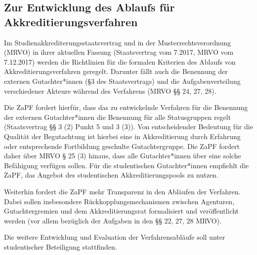 
\subsection{Zur Entwicklung des Ablaufs für Akkreditierungsverfahren}
Im Studienakkrediterungsstaatsvertrag und in der Musterrechtsverordnung (MRVO) in ihrer aktuellen Fassung (Staatsvertrag vom 7.2017, MRVO vom 7.12.2017) werden die Richtlinien für die formalen Kriterien des Ablaufs von Akkreditierungsverfahren geregelt. Darunter fällt auch die Benennung der externen Gutachter*innen (§3 des Staatsvertrags) und die Aufgabenverteilung verschiedener Akteure während des Verfahrens (MRVO §§ 24, 27, 28).

Die ZaPF fordert hierfür, dass das zu entwickelnde Verfahren für die Benennung der externen Gutachter*innen die Benennung für alle Statusgruppen regelt (Staatsvertrag §§ 3 (2) Punkt 5 und 3 (3)). Von entscheidender Bedeutung für die Qualität der Begutachtung ist hierbei eine in Akkreditierung durch Erfahrung oder entsprechende Fortbildung geschulte Gutachtergruppe. Die ZaPF fordert daher über MRVO § 25 (3) hinaus, dass alle Gutachter*innen über eine solche Befähigung verfügen sollen. Für die studentischen Gutachter*innen empfiehlt die ZaPF, das Angebot des studentischen Akkreditierungspools zu nutzen.

Weiterhin fordert die ZaPF mehr Transparenz in den Abläufen der Verfahren. Dabei sollen insbesondere Rückkopplungsmechanismen zwischen Agenturen, Gutachtergremien und dem Akkreditierungsrat formalisiert und veröffentlicht werden (vor allem bezüglich der Aufgaben in den §§ 22, 27, 28 MRVO).

Die weitere
Entwicklung und Evaluation der Verfahrensabläufe soll unter studentischer Beteiligung stattfinden.

